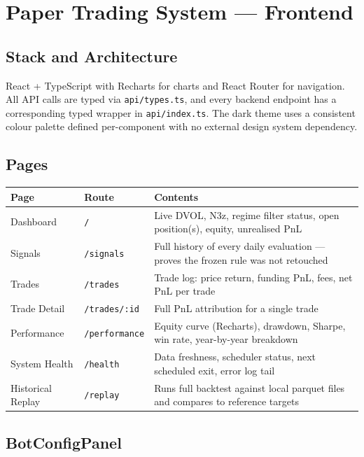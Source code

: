 \documentclass[11pt,a4paper]{article}
\newcommand{\code}[1]{\texttt{#1}}
\begin{document}
\section{Paper Trading System --- Frontend}

\subsection{Stack and Architecture}

React + TypeScript with Recharts for charts and React Router for navigation. All API calls are typed via \code{api/types.ts}, and every backend endpoint has a corresponding typed wrapper in \code{api/index.ts}. The dark theme uses a consistent colour palette defined per-component with no external design system dependency.

\subsection{Pages}

\begin{longtable}{@{}llp{7.5cm}@{}}
\toprule
\textbf{Page} & \textbf{Route} & \textbf{Contents} \\
\midrule
\endhead
Dashboard & \code{/} & Live DVOL, N3z, regime filter status, open position(s), equity, unrealised PnL \\[4pt]
Signals & \code{/signals} & Full history of every daily evaluation --- proves the frozen rule was not retouched \\[4pt]
Trades & \code{/trades} & Trade log: price return, funding PnL, fees, net PnL per trade \\[4pt]
Trade Detail & \code{/trades/:id} & Full PnL attribution for a single trade \\[4pt]
Performance & \code{/performance} & Equity curve (Recharts), drawdown, Sharpe, win rate, year-by-year breakdown \\[4pt]
System Health & \code{/health} & Data freshness, scheduler status, next scheduled exit, error log tail \\[4pt]
Historical Replay & \code{/replay} & Runs full backtest against local parquet files and compares to reference targets \\
\bottomrule
\end{longtable}

\subsection{BotConfigPanel}
\end{document}
